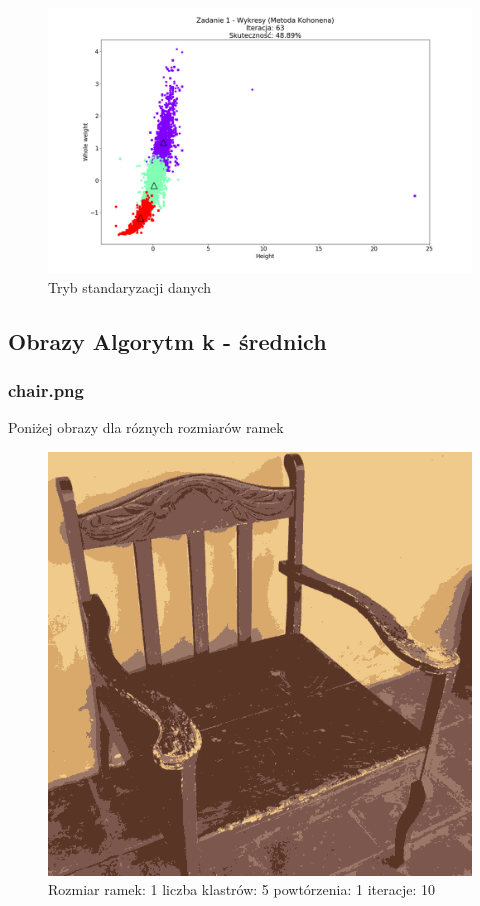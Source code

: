 \documentclass{classrep}
\begin{document}
{{{\begin{figure}[!htbp]
\centering
\includegraphics[width=\textwidth,width=90mm]{wykresy/plot_kohonenAbaloneStandardised.png}
\caption{Tryb standaryzacji danych}
\end{figure}
\FloatBarrier
}

\subsection{Obrazy Algorytm k - średnich}
{
\subsubsection{chair.png}
{

Poniżej obrazy dla róznych rozmiarów ramek
\begin{figure}[!htbp]
\centering
\includegraphics[width=\textwidth,width=90mm]{obrazy/chair_R1_K5_P1_It10.png}
\caption{Rozmiar ramek: 1 liczba klastrów: 5 powtórzenia: 1 iteracje: 10 }
\end{figure}

}}}}
\end{document}
